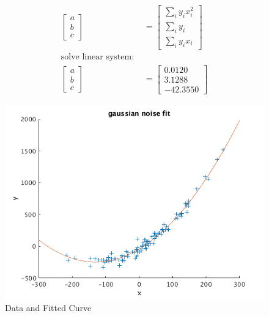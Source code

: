 \documentclass[12pt,letter]{article}
\begin{document}
\begin{enumerate}
\begin{enumerate}
\begin{align*}
    \begin{bmatrix}
      a \\ b \\ c
    \end{bmatrix}
    &=
    \begin{bmatrix}
      \sum_i y_i x_i^2\\
      \sum_i y_i\\
      \sum_i y_i x_i
    \end{bmatrix}\\
    \text{solve linear system: }\\
    \begin{bmatrix}
      a \\ b \\ c
    \end{bmatrix}
    &=
    \begin{bmatrix}
      0.0120\\
      3.1288\\
      -42.3550
    \end{bmatrix}
  \end{align*}
  
\begin{figure}[H]
\centering
\includegraphics[width=13cm]{imgs/q8_a.png}
 \caption{Data and Fitted Curve}
\label{label}
\end{figure}

\pagebreak


\end{enumerate}
\end{enumerate}
\end{document}
